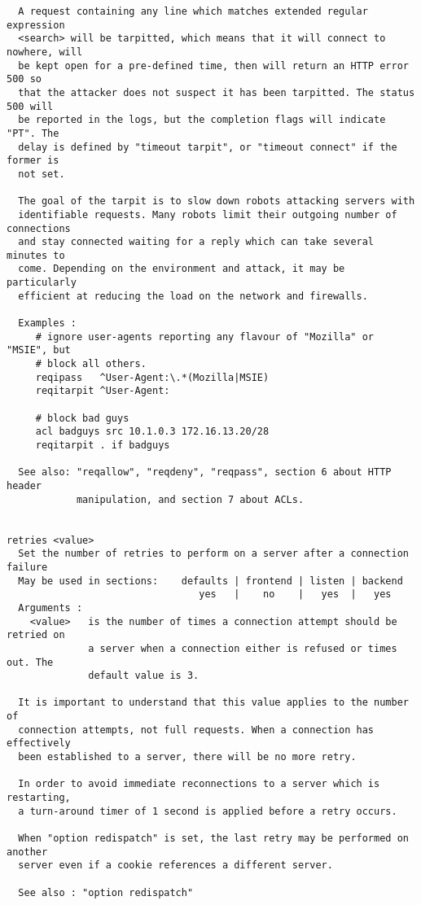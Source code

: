 \begin{verbatim}
  A request containing any line which matches extended regular expression
  <search> will be tarpitted, which means that it will connect to nowhere, will
  be kept open for a pre-defined time, then will return an HTTP error 500 so
  that the attacker does not suspect it has been tarpitted. The status 500 will
  be reported in the logs, but the completion flags will indicate "PT". The
  delay is defined by "timeout tarpit", or "timeout connect" if the former is
  not set.

  The goal of the tarpit is to slow down robots attacking servers with
  identifiable requests. Many robots limit their outgoing number of connections
  and stay connected waiting for a reply which can take several minutes to
  come. Depending on the environment and attack, it may be particularly
  efficient at reducing the load on the network and firewalls.

  Examples :
     # ignore user-agents reporting any flavour of "Mozilla" or "MSIE", but
     # block all others.
     reqipass   ^User-Agent:\.*(Mozilla|MSIE)
     reqitarpit ^User-Agent:

     # block bad guys
     acl badguys src 10.1.0.3 172.16.13.20/28
     reqitarpit . if badguys

  See also: "reqallow", "reqdeny", "reqpass", section 6 about HTTP header
            manipulation, and section 7 about ACLs.


retries <value>
  Set the number of retries to perform on a server after a connection failure
  May be used in sections:    defaults | frontend | listen | backend
                                 yes   |    no    |   yes  |   yes
  Arguments :
    <value>   is the number of times a connection attempt should be retried on
              a server when a connection either is refused or times out. The
              default value is 3.

  It is important to understand that this value applies to the number of
  connection attempts, not full requests. When a connection has effectively
  been established to a server, there will be no more retry.

  In order to avoid immediate reconnections to a server which is restarting,
  a turn-around timer of 1 second is applied before a retry occurs.

  When "option redispatch" is set, the last retry may be performed on another
  server even if a cookie references a different server.

  See also : "option redispatch"



\end{verbatim}
